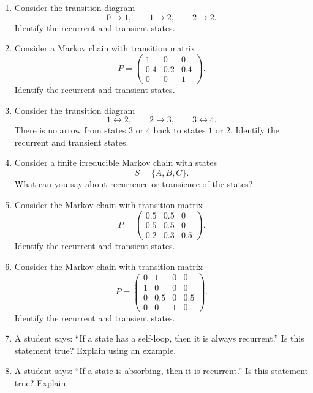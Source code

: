 \documentclass[12pt,a4paper]{article}
\theoremstyle{notestyle}
\begin{document}
\begin{enumerate}[label=\textbf{Q\arabic*.}, leftmargin=1.2cm]
    \item Consider the transition diagram
    \[
    0\to 1,\qquad 1\to 2,\qquad 2\to 2.
    \]
    Identify the recurrent and transient states.

    \item Consider a Markov chain with transition matrix
    \[
    P=
    \begin{pmatrix}
    1 & 0 & 0\\
    0.4 & 0.2 & 0.4\\
    0 & 0 & 1
    \end{pmatrix}.
    \]
    Identify the recurrent and transient states.

    \item Consider the transition diagram
    \[
    1\leftrightarrow 2,\qquad 2\to 3,\qquad 3\leftrightarrow 4.
    \]
    There is no arrow from states $3$ or $4$ back to states $1$ or $2$. Identify the recurrent and transient states.

    \item Consider a finite irreducible Markov chain with states
    \[
    S=\{A,B,C\}.
    \]
    What can you say about recurrence or transience of the states?

    \item Consider the Markov chain with transition matrix
    \[
    P=
    \begin{pmatrix}
    0.5 & 0.5 & 0\\
    0.5 & 0.5 & 0\\
    0.2 & 0.3 & 0.5
    \end{pmatrix}.
    \]
    Identify the recurrent and transient states.

    \item Consider the Markov chain with transition matrix
    \[
    P=
    \begin{pmatrix}
    0 & 1 & 0 & 0\\
    1 & 0 & 0 & 0\\
    0 & 0.5 & 0 & 0.5\\
    0 & 0 & 1 & 0
    \end{pmatrix}.
    \]
    Identify the recurrent and transient states.

    \item A student says: ``If a state has a self-loop, then it is always recurrent.'' Is this statement true? Explain using an example.

    \item A student says: ``If a state is absorbing, then it is recurrent.'' Is this statement true? Explain.
\end{enumerate}
\end{document}
